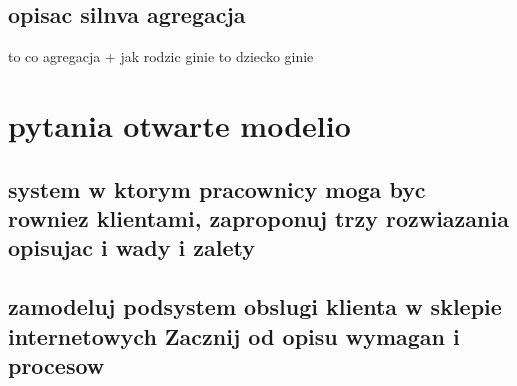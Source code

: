 \documentclass[11pt]{article}
\begin{document}
\subsection{opisac silnva agregacja}
\label{sec:org4a751f5}
to co agregacja + jak rodzic ginie to dziecko ginie
\section{pytania otwarte modelio}
\label{sec:org8bd7c86}
\subsection{system w ktorym pracownicy moga byc rowniez klientami, zaproponuj trzy rozwiazania opisujac i wady i zalety}
\label{sec:org89dbc39}
\subsection{zamodeluj podsystem obslugi klienta w sklepie internetowych Zacznij od opisu wymagan i procesow}
\label{sec:org405c672}
\end{document}
